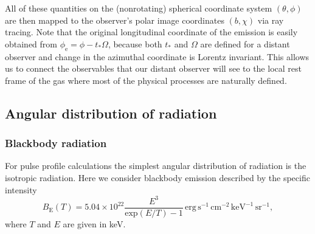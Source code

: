 \documentclass{aa}
\newcommand{\refe}[1]{#1}
\newcommand{\refedel}[1]{}
\begin{document}
All of these quantities on the \refe{(nonrotating)} \refedel{star's} spherical coordinate system $(\theta, \phi)$ are then mapped to the observer's polar image coordinates $(b, \chi)$ via ray tracing.
Note that the original longitudinal coordinate of the emission is easily obtained from $\phi_{\mathrm{e}} = \phi - t_* \Omega$, because both $t_*$ and $\Omega$ are defined for a distant observer and change in the azimuthal coordinate is Lorentz invariant.
\refe{This allows us to connect the observables that our distant observer will see to the local rest frame of the gas where most of the physical processes are naturally defined.}

\refedel{
This ends our discussion of ray tracing from the image plane to the star.
In many ways, it is the more intuitive direction, even though the time coordinate is propagated backwards, because it forces us to think from the point of view of the observer.
}



\subsection{Angular distribution of radiation}\label{sect:angular_distr}
\subsubsection{\refe{Blackbody} radiation}

For pulse profile calculations the simplest angular distribution of radiation is the isotropic radiation.
Here we consider blackbody emission described by the specific intensity
\begin{equation}
  B_{\mathrm{E}}(T) = 5.04 \times 10^{22} \frac{E^3}{\mathrm{exp}(E/T) -1} \,\mathrm{erg}\,\mathrm{s}^{-1}\,\mathrm{cm}^{-2}\,\mathrm{keV}^{-1}\,\mathrm{sr}^{-1},
\end{equation}
where $T$ and $E$ are given in keV.
\refedel{The radiation is isotropic and there is no dependence on the angle $\alpha'=\cos^{-1}\mu'$, measured relative to the surface normal by the co-rotating observer.}
\end{document}
